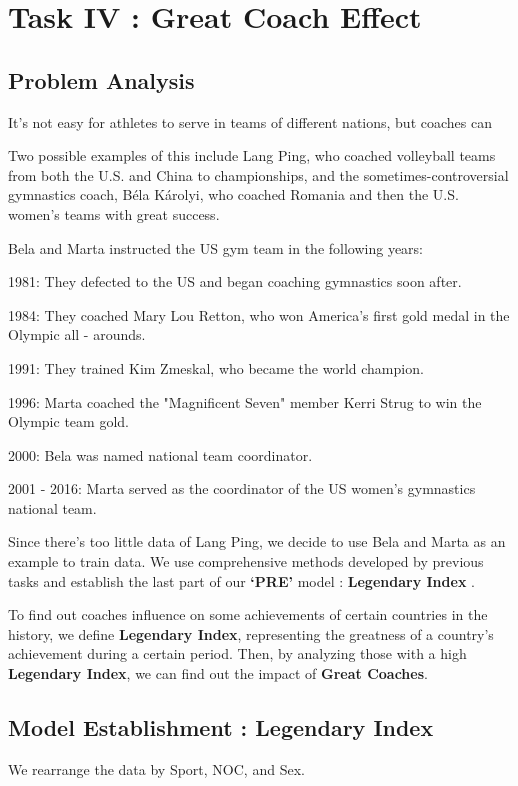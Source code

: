 

\section{Task IV : Great Coach Effect}

\subsection{Problem Analysis}
It's not easy for athletes to serve in teams of different nations, but coaches can\cite{thompson2016analyzing}

Two possible examples of this include Lang Ping,
who coached volleyball teams from both the U.S. and China to championships, and the
sometimes-controversial gymnastics coach, Béla Károlyi, who coached Romania and
then the U.S. women's teams with great success. \cite{2,3}

Bela and Marta instructed the US gym team in the following years:

1981: They defected to the US and began coaching gymnastics soon after.

1984: They coached Mary Lou Retton, who won America's first gold medal in the Olympic all - arounds.

1991: They trained Kim Zmeskal, who became the world champion.

1996: Marta coached the "Magnificent Seven" member Kerri Strug to win the Olympic team gold.

2000: Bela was named national team coordinator.

2001 - 2016: Marta served as the coordinator of the US women's gymnastics national team.

Since there's too little data of Lang Ping, we decide to use Bela and Marta as an example to train data. We use comprehensive methods developed by previous tasks and establish the last part of our \textbf{`PRE'} model : \textbf{Legendary Index} .

To find out coaches influence on some achievements of certain countries in the history, we define \textbf{Legendary Index}, representing the greatness of a country's achievement during a certain period.
Then, by analyzing those with a high \textbf{Legendary Index}, we can find out the impact of \textbf{Great Coaches}.

\subsection{Model Establishment : Legendary Index}
We rearrange the data by Sport, NOC, and Sex. 

